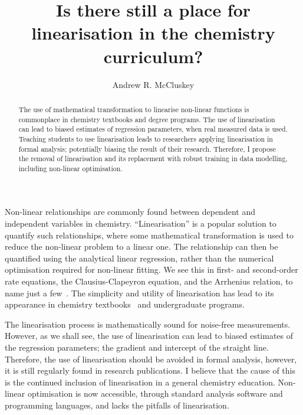 \documentclass[reprint,superscriptaddress,nobibnotes,amsmath,amssymb]{revtex4-2}
\begin{document}
\title{Is there still a place for linearisation in the chemistry curriculum?}

\author{Andrew R. McCluskey}

\begin{abstract}
    The use of mathematical transformation to linearise non-linear functions is commonplace in chemistry textbooks and degree programs. 
    The use of linearisation can lead to biased estimates of regression parameters, when real measured data is used. 
    Teaching students to use linearisation leads to researchers applying linearisation in formal analysis; potentially biasing the result of their research. 
    Therefore, I propose the removal of linearisation and its replacement with robust training in data modelling, including non-linear optimisation.  
\end{abstract}

\maketitle 

Non-linear relationships are commonly found between dependent and independent variables in chemistry. 
``Linearisation'' is a popular solution to quantify such relationships, where some mathematical transformation is used to reduce the non-linear problem to a linear one. 
The relationship can then be quantified using the analytical linear regression, rather than the numerical optimisation required for non-linear fitting. 
We see this in first- and second-order rate equations, the Clausius-Clapeyron equation, and the Arrhenius relation, to name just a few~\cite{perrin_linear_2017,harper_data_2017,monk_math_2010}.
The simplicity and utility of linearisation has lead to its appearance in chemistry textbooks~\cite{monk_math_2010,atkins_physical_2018} and undergraduate programs. 

The linearisation process is mathematically sound for noise-free measurements. 
However, as we shall see, the use of linearisation can lead to biased estimates of the regression parameters; the gradient and intercept of the straight line. 
Therefore, the use of linearisation should be avoided in formal analysis, however, it is still regularly found in research publications. 
I believe that the cause of this is the continued inclusion of linearisation in a general chemistry education. 
Non-linear optimisation is now accessible, through standard analysis software and programming languages, and lacks the pitfalls of linearisation. 
\end{document}
